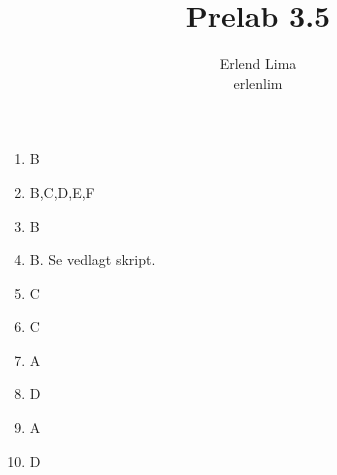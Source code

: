 \documentclass[a4paper,11pt, norsk, twoside]{article}
\title{Prelab 3.5} \author{Erlend Lima\\ erlenlim}
\begin{document}
\maketitle

\begin{enumerate}[1.]
\item B
\item B,C,D,E,F
\item B
\item B. Se vedlagt skript.
\item C
\item C
\item A
\item D
\item A
\item D
\end{enumerate}
\end{document}
